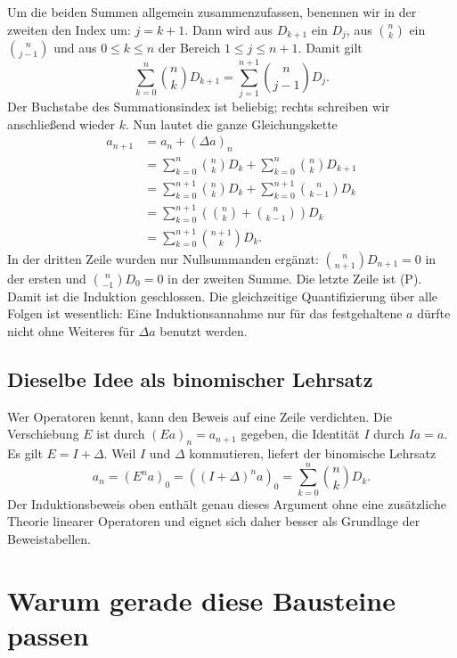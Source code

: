 Um die beiden Summen allgemein zusammenzufassen, benennen wir in der
zweiten den Index um: $j=k+1$. Dann wird aus $D_{k+1}$ ein $D_j$,
aus $\binom nk$ ein $\binom n{j-1}$ und aus $0\leq k\leq n$ der
Bereich $1\leq j\leq n+1$. Damit gilt
\[
 \sum_{k=0}^n\binom nkD_{k+1}
 =\sum_{j=1}^{n+1}\binom n{j-1}D_j.
\]
Der Buchstabe des Summationsindex ist beliebig; rechts schreiben wir
anschließend wieder $k$. Nun lautet die ganze Gleichungskette
\[
\begin{aligned}
 a_{n+1}
 &=a_n+(\Delta a)_n\\
 &=\sum_{k=0}^n\binom nkD_k+
   \sum_{k=0}^n\binom nkD_{k+1}\\
 &=\sum_{k=0}^{n+1}\binom nkD_k+
   \sum_{k=0}^{n+1}\binom n{k-1}D_k\\
 &=\sum_{k=0}^{n+1}
   \left(\binom nk+\binom n{k-1}\right)D_k\\
 &=\sum_{k=0}^{n+1}\binom{n+1}{k}D_k.
\end{aligned}
\]
In der dritten Zeile wurden nur Nullsummanden ergänzt:
$\binom n{n+1}D_{n+1}=0$ in der ersten und
$\binom n{-1}D_0=0$ in der zweiten Summe. Die letzte Zeile ist (P).
Damit ist die Induktion geschlossen. Die gleichzeitige Quantifizierung
über alle Folgen ist wesentlich: Eine Induktionsannahme nur für das
festgehaltene $a$ dürfte nicht ohne Weiteres für $\Delta a$ benutzt werden.

\subsection*{Dieselbe Idee als binomischer Lehrsatz}

Wer Operatoren kennt, kann den Beweis auf eine Zeile verdichten.
Die Verschiebung $E$ ist durch $(Ea)_n=a_{n+1}$ gegeben, die Identität
$I$ durch $Ia=a$. Es gilt $E=I+\Delta$. Weil $I$ und $\Delta$
kommutieren, liefert der binomische Lehrsatz
\[
 a_n=(E^na)_0=((I+\Delta)^na)_0
     =\sum_{k=0}^n\binom nkD_k.
\]
Der Induktionsbeweis oben enthält genau dieses Argument ohne eine
zusätzliche Theorie linearer Operatoren und eignet sich daher besser
als Grundlage der Beweistabellen.

\section{Warum gerade diese Bausteine passen}

